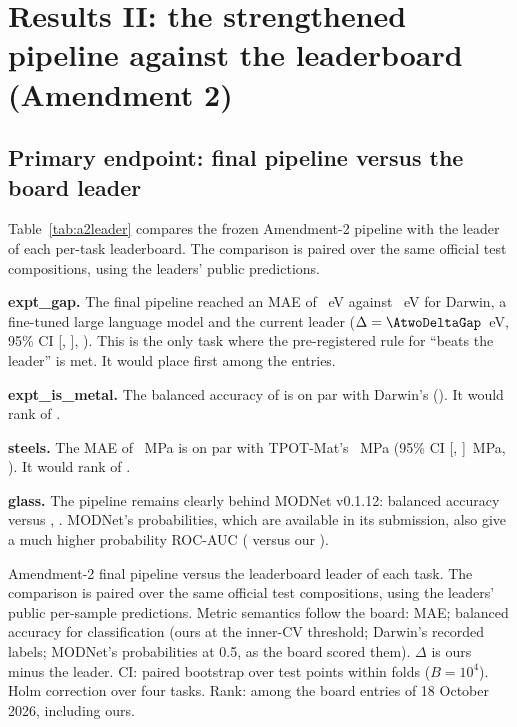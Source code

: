 \section{Results II: the strengthened pipeline against the leaderboard (Amendment 2)}
\label{sec:results2}

\subsection{Primary endpoint: final pipeline versus the board leader}
Table~\ref{tab:a2leader} compares the frozen Amendment-2 pipeline with the leader of each per-task leaderboard. The comparison is paired over the same official test compositions, using the leaders' public predictions.

\textbf{expt\_gap.} The final pipeline reached an MAE of \AtwoFinalGap{}~eV against \AtwoLeaderGap{}~eV for Darwin, a fine-tuned large language model and the current leader ($\Delta=\AtwoDeltaGap$~eV, 95\% CI [\AtwoCIloGap, \AtwoCIhiGap], \AtwoPHolmExprGap). This is the only task where the pre-registered rule for ``beats the leader'' is met. It would place first among the \AtwoNEntriesGap{} entries.

\textbf{expt\_is\_metal.} The balanced accuracy of \AtwoFinalMetal{} is on par with Darwin's \AtwoLeaderMetal{} (\AtwoPHolmExprMetal). It would rank \AtwoRankMetal{} of \AtwoNEntriesMetal.

\textbf{steels.} The MAE of \AtwoFinalSteels{}~MPa is on par with TPOT-Mat's \AtwoLeaderSteels{}~MPa (95\% CI [\AtwoCIloSteels, \AtwoCIhiSteels]~MPa, \AtwoPHolmExprSteels). It would rank \AtwoRankSteels{} of \AtwoNEntriesSteels.

\textbf{glass.} The pipeline remains clearly behind MODNet v0.1.12: balanced accuracy \AtwoFinalGlass{} versus \AtwoLeaderGlass{}, \AtwoPHolmExprGlass. MODNet's probabilities, which are available in its submission, also give a much higher probability ROC-AUC (\AtwoLeaderAUCGlass{} versus our \AtwoAUCGlass).

\begin{table}[t]
\centering
\caption{Amendment-2 final pipeline versus the leaderboard leader of each task. The comparison is paired over the same official test compositions, using the leaders' public per-sample predictions. Metric semantics follow the board: MAE; balanced accuracy for classification (ours at the inner-CV threshold; Darwin's recorded labels; MODNet's probabilities at 0.5, as the board scored them). $\Delta$ is ours minus the leader. CI: paired bootstrap over test points within folds ($B=10^4$). Holm correction over four tasks. Rank: among the board entries of 18 October 2026, including ours.}
\label{tab:a2leader}
\begin{adjustbox}{max width=\textwidth}

\end{adjustbox}
\end{table}

